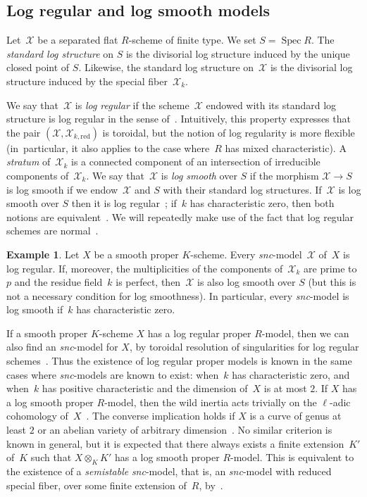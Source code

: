 \documentclass[JEP,XML,SOM,Unicode,NoFloatCountersInSection]{cedram}
\theoremstyle{definition}
\newtheorem{example}[equation]{Example}
\numberwithin{equation}{subsection}
\newcommand{\cX}{\ensuremath{\mathscr{X}}}
\newcommand{\snc}{\textit{snc}}
\newcommand{\red}{\mathrm{red}}
\DeclareMathOperator{\Spec}{Spec}
\begin{document}
\subsection{Log regular and log smooth models}
Let~$\cX$ be a separated flat $R$\nobreakdash-scheme of finite type. We set $S=\Spec R$. The {\em standard log structure} on $S$ is the divisorial log structure induced by the unique closed point of $S$. Likewise, the standard log structure on~$\cX$ is the divisorial log structure induced by the special fiber~$\cX_k$.

We say that~$\cX$ is {\em log regular} if the scheme~$\cX$ endowed with its standard log structure
is log regular in the sense of~\cite{kato}. Intuitively, this property expresses that the pair $(\cX,\cX_{k,\red})$ is toroidal, but the notion of log regularity is more flexible (in~particular, it also applies to the case where~$R$ has mixed characteristic). A {\em stratum} of~$\cX_k$ is a connected component of an intersection of irreducible components of~$\cX_k$.
We say that~$\cX$ is {\em log smooth} over $S$ if the morphism $\cX\to S$ is log smooth if we endow~$\cX$ and
$S$ with their standard log structures.
If~$\cX$ is log smooth over $S$ then it is log regular~\cite[8.2]{kato}; if~$k$ has characteristic zero, then both notions are equivalent~\cite[3.6.1]{logzeta}.
We will repeatedly make use of the fact that log regular schemes are normal~\cite[4.1]{kato}.

\begin{example}
Let $X$ be a smooth proper $K$\nobreakdash-scheme. Every \snc-model~$\cX$ of~$X$ is log regular. If, moreover, the multiplicities of the components of~$\cX_k$ are prime to $p$ and the residue field~$k$ is perfect, then~$\cX$ is also log smooth over $S$ (but this is not a necessary condition for log smoothness). In particular, every \snc-model is log smooth if~$k$ has characteristic zero.
\end{example}

If a smooth proper $K$\nobreakdash-scheme $X$ has a log regular proper $R$\nobreakdash-model, then we can also find an \snc-model for $X$, by toroidal resolution of singularities for log regular schemes~\cite{kato}.
Thus the existence of log regular proper models is known in the same cases where \snc-models are known to exist: when~$k$ has characteristic zero, and when~$k$ has positive characteristic and the dimension of~$X$ is at most $2$.
If $X$ has a log smooth proper $R$\nobreakdash-model, then the wild inertia acts trivially on the $\ell$-adic cohomology of~$X$~\cite[0.1.1]{nakayama-nearby}.
The converse implication holds if $X$ is a curve of genus at least $2$ or an abelian variety of arbitrary dimension~\cite{saito-sstable, stix, bellardini-smeets}. No similar criterion is known in general, but it is expected that there always exists a finite extension~$K'$ of~$K$ such that $X\otimes_K K'$ has a log smooth proper $R$\nobreakdash-model. This is equivalent to the existence of a {\em semistable} \snc-model, that is, an \snc-model with reduced special fiber, over some finite extension of~$R$, by~\cite{saito-sstable}.
\end{document}
